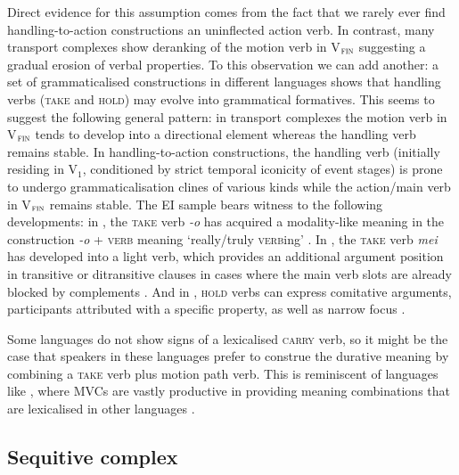 Direct evidence for this assumption comes from the fact that we rarely ever find handling-to-action constructions an uninflected action verb.
In contrast, many transport complexes show deranking of the motion verb in V$_{\textsc{fin}}$ suggesting a gradual erosion of verbal properties. To this observation we can add another: a set of grammaticalised constructions in different languages shows that handling verbs (\textsc{take} and \textsc{hold)} may evolve into grammatical formatives. This seems to suggest the following general pattern: in transport complexes the motion verb in V$_{\textsc{fin}}$ tends to develop into a directional element whereas the handling verb remains stable. In handling-to-action constructions, the handling verb (initially residing in V$_{1}$, conditioned by strict temporal iconicity of event stages) is prone to undergo grammaticalisation clines of various kinds while the action/main verb in V$_{\textsc{fin}}$ remains stable. The EI sample bears witness to the following developments: in , the \textsc{take} verb \textit{-o} has acquired a modality-like meaning in the construction \textit{-o} + \textsc{verb} meaning `really/truly \textsc{verb}ing' \citep[195]{dol2007grammar}. In , the \textsc{take} verb \textit{mei} has developed into a light verb, which provides an additional argument position in transitive or ditransitive clauses in cases where the main verb slots are already blocked by complements \citep[203]{huber2011}. And in , \textsc{hold} verbs can express comitative arguments, participants attributed with a specific property, as well as narrow focus \citep[382--7]{kratochvil2007grammar}.

Some languages do not show signs of a lexicalised \textsc{carry} verb, so it might be the case that speakers in these languages prefer to construe the durative meaning by combining a \textsc{take} verb plus motion path verb. This is reminiscent of languages like , where MVCs are vastly productive in providing meaning combinations that are lexicalised in other languages \citep{pawley2011event}. 

\subsection{Sequitive complex} \label{sec:sequitive}

